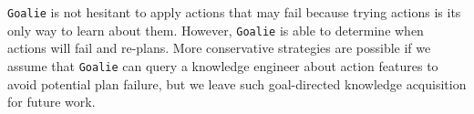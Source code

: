 \documentclass{article}
\def\goalie{{\tt Goalie}}
\begin{document}
\goalie{} is not hesitant to apply actions that may fail because trying actions
is its only way to learn about them.  However, \goalie{} is able to determine
when actions will fail and re-plans.  More conservative strategies are possible
if we assume that \goalie{} can query a knowledge engineer about action features
to avoid potential plan failure, but we leave such goal-directed knowledge
acquisition for future work.




%


%
%
\end{document}
